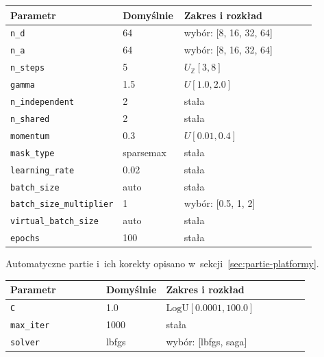 \par\medskip\noindent\begin{minipage}{\linewidth}\captionsetup{hypcap=false}\centering\footnotesize
{}
\begin{tabularx}{\linewidth}{@{}P{0.32\linewidth}P{0.20\linewidth}Y@{}}
\toprule Parametr & Domyślnie & Zakres i rozkład \\
\midrule
\texttt{n\_d} & 64 & wybór: [8, 16, 32, 64] \\
\texttt{n\_a} & 64 & wybór: [8, 16, 32, 64] \\
\texttt{n\_steps} & 5 & $U_{\mathbb Z}[3, 8]$ \\
\texttt{gamma} & 1.5 & $U[1.0, 2.0]$ \\
\texttt{n\_independent} & 2 & stała \\
\texttt{n\_shared} & 2 & stała \\
\texttt{momentum} & 0.3 & $U[0.01, 0.4]$ \\
\texttt{mask\_type} & sparsemax & stała \\
\texttt{learning\_rate} & 0.02 & stała \\
\texttt{batch\_size} & auto & stała \\
\texttt{batch\_size\_multiplier} & 1 & wybór: [0.5, 1, 2] \\
\texttt{virtual\_batch\_size} & auto & stała \\
\texttt{epochs} & 100 & stała \\
\bottomrule\end{tabularx}\end{minipage}\par\medskip

Automatyczne partie i~ich korekty opisano w~sekcji~\ref{sec:partie-platformy}.

\par\medskip\noindent\begin{minipage}{\linewidth}\captionsetup{hypcap=false}\centering\footnotesize
{}
\begin{tabularx}{\linewidth}{@{}P{0.32\linewidth}P{0.20\linewidth}Y@{}}
\toprule Parametr & Domyślnie & Zakres i rozkład \\
\midrule
\texttt{C} & 1.0 & $\mathrm{LogU}[0.0001, 100.0]$ \\
\texttt{max\_iter} & 1000 & stała \\
\texttt{solver} & lbfgs & wybór: [lbfgs, saga] \\
\bottomrule\end{tabularx}\end{minipage}\par\medskip

